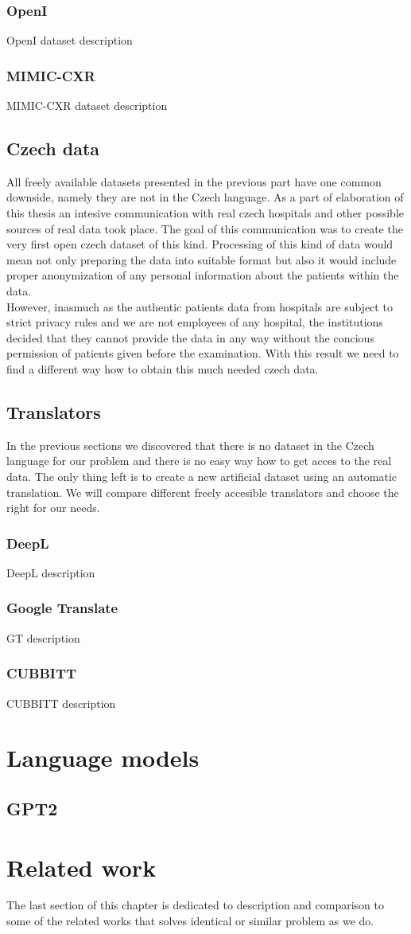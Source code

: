 \subsubsection{OpenI}
OpenI dataset description
\subsubsection{MIMIC-CXR}
MIMIC-CXR dataset description

\subsection{Czech data}
All freely available datasets presented in the previous part have one common downside, namely they are not in the Czech language. As a part of elaboration of this thesis an intesive communication with real czech hospitals and other possible sources of real data took place. The goal of this communication was to create the very first open czech dataset of this kind. Processing of this kind of data would mean not only preparing the data into suitable format but also it would include proper anonymization of any personal information about the patients within the data. \\

However, inasmuch as the authentic patients data from hospitals are subject to strict privacy rules and we are not employees of any hospital, the institutions decided that they cannot provide the data in any way without the concious permission of patients given before the examination. With this result we need to find a different way how to obtain this much needed czech data.

\subsection{Translators}
In the previous sections we discovered that there is no dataset in the Czech language for our problem and there is no easy way how to get acces to the real data. The only thing left is to create a new artificial dataset using an automatic translation. We will compare different freely accesible translators and choose the right for our needs.

\subsubsection{DeepL}
DeepL description
\subsubsection{Google Translate}
GT description
\subsubsection{CUBBITT}
CUBBITT description

\section{Language models}
\subsection{GPT2}

\section{Related work}
The last section of this chapter is dedicated to description and comparison to some of the related works that solves identical or similar problem as we do.